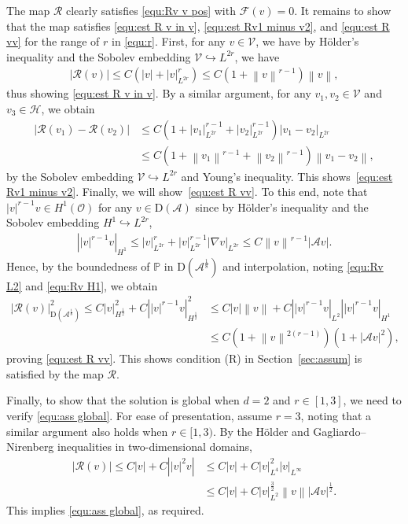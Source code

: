 \documentclass[11pt, reqno]{amsart}
\theoremstyle{definition}
\numberwithin{equation}{section}
\newcommand{\bb}{\mathbb}
\newcommand{\norm}[1]{\left\|{#1}\right\|}
\newcommand{\abs}[1]{\left|{#1}\right|}
\begin{document}
The map $\mathcal{R}$ clearly satisfies \eqref{equ:Rv v pos} with $\mathcal{F}(v)=0$. It remains to show that the map satisfies \eqref{equ:est R v in v}, \eqref{equ:est Rv1 minus v2}, and \eqref{equ:est R vv} for the range of $r$ in \eqref{equ:r}.
First, for any $v\in\mathcal{V}$, we have by H\"older's inequality and the Sobolev embedding $\mathcal{V} \hookrightarrow L^{2r}$, we have
\begin{align}\label{equ:Rv L2}
	\abs{\mathcal{R}(v)} \leq C\left(\abs{v} + \abs{v}_{L^{2r}}^{r}\right) 
	\leq C \left(1+ \norm{v}^{r-1}\right) \norm{v},
\end{align}
thus showing \eqref{equ:est R v in v}.
By a similar argument, for any $v_1,v_2\in \mathcal{V}$ and $v_3\in \mathcal{H}$, we obtain
\begin{align*}
    \abs{\mathcal{R}(v_1)-\mathcal{R}(v_2)}
    &\leq
    C\left(1+\abs{v_1}_{L^{2r}}^{r-1} + \abs{v_2}_{L^{2r}}^{r-1} \right) \abs{v_1-v_2}_{L^{2r}}
    \\
    &\leq
    C\left(1+\norm{v_1}^{r-1} +\norm{v_2}^{r-1} \right) \norm{v_1-v_2},
\end{align*}
by the Sobolev embedding $\mathcal{V}\hookrightarrow L^{2r}$ and Young's inequality. This shows~\eqref{equ:est Rv1 minus v2}. Finally, we will show~\eqref{equ:est R vv}. To this end, note that $\abs{v}^{r-1} v\in H^1(\mathscr{O})$ for any $v\in \mathrm{D}(\mathcal{A})$ since by H\"older's inequality and the Sobolev embedding $H^1\hookrightarrow L^{2r}$,
\begin{align}\label{equ:Rv H1}
	\abs{\abs{v}^{r-1} v}_{H^1} \leq 
	\abs{v}_{L^{2r}}^r + \abs{v}_{L^{2r}}^{r-1} \abs{\nabla v}_{L^{2r}}
	\leq
	C\norm{v}^{r-1} \abs{\mathcal{A} v}.
\end{align}
Hence, by the boundedness of $\bb{P}$ in $\mathrm{D}(\mathcal{A}^{\frac18})$ and interpolation, noting \eqref{equ:Rv L2} and \eqref{equ:Rv H1}, we obtain
\begin{align}\label{equ:Rv A18}
	\abs{\mathcal{R}(v)}_{\mathrm{D}(\mathcal{A}^{\frac18})}^2
	\leq
	C\abs{v}_{H^{\frac12}}^2 + C\abs{ \abs{v}^{r-1} v}_{H^{\frac12}}^2
	&\leq
	C\abs{v} \norm{v} + C \abs{ \abs{v}^{r-1} v}_{L^2} \abs{ \abs{v}^{r-1} v}_{H^1}
	\nonumber \\
	&\leq
	C\left(1+\norm{v}^{2(r-1)} \right) \left(1+\abs{\mathcal{A} v}^2 \right),
\end{align}
proving \eqref{equ:est R vv}. This shows condition (R) in Section~\ref{sec:assum} is satisfied by the map $\mathcal{R}$.

Finally, to show that the solution is global when $d=2$ and $r\in [1,3]$, we need to verify \eqref{equ:ass global}. For ease of presentation, assume $r=3$, noting that a similar argument also holds when $r\in [1,3)$. By the H\"older and Gagliardo--Nirenberg inequalities in two-dimensional domains,
\begin{align}\label{equ:Rv global}
	\abs{\mathcal{R}(v)}
	\leq
	C\abs{v} + C\abs{\abs{v}^2 v}
	&\leq
	C\abs{v} + C\abs{v}_{L^4}^2 \abs{v}_{L^\infty} 
	\nonumber\\
	&\leq
	C\abs{v} + C\abs{v}_{L^2}^{\frac32} \norm{v} \abs{\mathcal{A}v}^{\frac12}.
\end{align}
This implies \eqref{equ:ass global}, as required.
\end{document}
